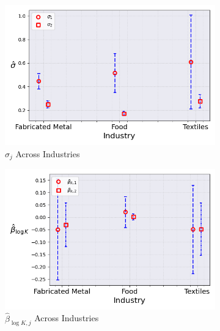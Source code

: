 \documentclass{article}
\begin{document}
\begin{figure}[ht!]
    \begin{subfigure}[t]{0.32\textwidth}
        \centering
        \includegraphics[width=\textwidth]{figure/stationary_normal_kmshare_ciiu_sigma_across_industries_m2.png}
        \caption{$\hat\sigma_j$ Across Industries}
    \end{subfigure}
    \begin{subfigure}[t]{0.32\textwidth}
        \centering
        \includegraphics[width=\textwidth]{figure/stationary_normal_kmshare_ciiu_beta_k_across_industries_m2.png}
        \caption{$\hat{\beta}_{\log K, j}$ Across Industries}
    \end{subfigure}
    \begin{subfigure}[t]{0.32\textwidth}
        \centering

\end{subfigure}
\end{figure}
\end{document}
